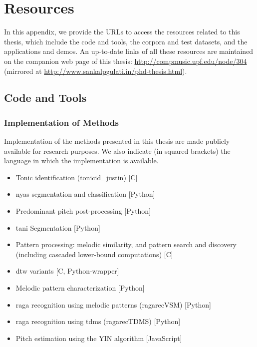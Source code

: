 
\chapter{Resources}\label{app:resources}

In this appendix, we provide the URLs to access the resources related to this thesis, which include the code and tools, the corpora and test datasets, and the applications and demos. An up-to-date links of all these resources are maintained on the companion web page of this thesis: \url{http://compmusic.upf.edu/node/304} (mirrored at \url{http://www.sankalpgulati.in/phd-thesis.html}).

\section*{Code and Tools}

\subsection*{Implementation of Methods}
Implementation of the methods presented in this thesis are made publicly available for research purposes. We also indicate (in squared brackets) the language in which the implementation is available.

\begin{itemize}
	\item Tonic identification (\acrshort{tonicid_justin}) [C]
	\item \Gls{nyas} segmentation and classification [Python]
	\item Predominant pitch post-processing [Python]
	\item \Gls{tani} Segmentation [Python]
	\item Pattern processing: melodic similarity, and pattern search and discovery (including cascaded lower-bound computations) [C]
	\item \Gls{dtw} variants [C, Python-wrapper]
	\item Melodic pattern characterization [Python]
	\item \Gls{raga} recognition using melodic patterns (\acrshort{ragarecVSM}) [Python]
	\item \Gls{raga} recognition using \acrshort{tdms} (\acrshort{ragarecTDMS}) [Python]
	\item Pitch estimation using the YIN algorithm [JavaScript]
\end{itemize}

